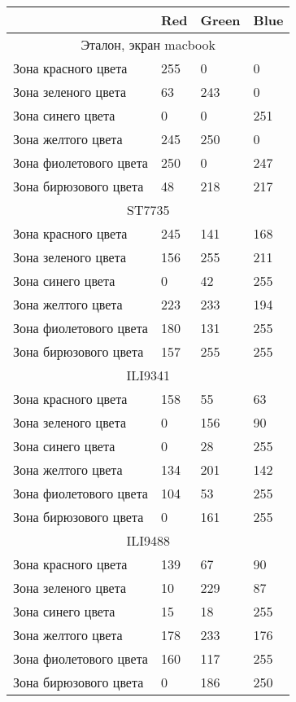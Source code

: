 	\begin{tabular}{ |p{6cm}||p{2cm}|p{2cm}|p{2cm}|  }
		\hline
							   & Red & Green & Blue \\ \hline
		\multicolumn{4}{|c|}{Эталон, экран macbook} \\ \hline
		Зона красного цвета    & 255 & 0     & 0    \\
		Зона зеленого цвета    & 63  & 243   & 0    \\
		Зона синего цвета      & 0   & 0     & 251  \\
		Зона желтого цвета     & 245 & 250   & 0    \\
		Зона фиолетового цвета & 250 & 0     & 247  \\
		Зона бирюзового цвета  & 48  & 218   & 217  \\ \hline
		\multicolumn{4}{|c|}{ST7735} \\ \hline
		Зона красного цвета    & 245 & 141   & 168  \\  %
		Зона зеленого цвета    & 156 & 255   & 211  \\  %
		Зона синего цвета      & 0   & 42    & 255  \\  %
		Зона желтого цвета     & 223 & 233   & 194  \\  %
		Зона фиолетового цвета & 180 & 131   & 255  \\
		Зона бирюзового цвета  & 157 & 255   & 255  \\ \hline  %
		\multicolumn{4}{|c|}{ILI9341} \\ \hline
		Зона красного цвета    & 158 & 55    & 63   \\  %
		Зона зеленого цвета    & 0   & 156   & 90   \\  %
		Зона синего цвета      & 0   & 28    & 255  \\  %
		Зона желтого цвета     & 134 & 201   & 142  \\  %
		Зона фиолетового цвета & 104 & 53    & 255  \\  %
		Зона бирюзового цвета  & 0   & 161   & 255  \\ \hline
		\multicolumn{4}{|c|}{ILI9488} \\ \hline
		Зона красного цвета    & 139 & 67    & 90   \\  %
		Зона зеленого цвета    & 10  & 229   & 87   \\  %
		Зона синего цвета      & 15  & 18    & 255  \\  %
		Зона желтого цвета     & 178 & 233   & 176  \\  %
		Зона фиолетового цвета & 160 & 117   & 255  \\
		Зона бирюзового цвета  & 0   & 186   & 250  \\ \hline %
	\end{tabular}\\

